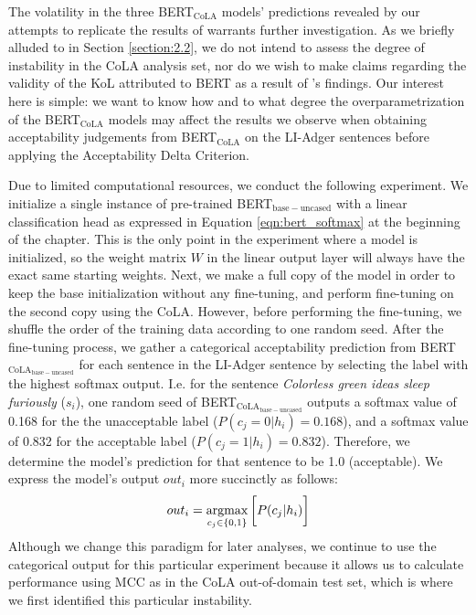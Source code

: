 The volatility in the three BERT$_\mathrm{CoLA}$ models' predictions revealed by our attempts to replicate the results of \citet{warstadt2019linguistic} warrants further investigation.  As we briefly alluded to in Section \ref{section:2.2}, we do not intend to assess the degree of instability in the CoLA analysis set, nor do we wish to make claims regarding the validity of the KoL attributed to BERT as a result of \citeauthor{warstadt2019linguistic}'s findings.  Our interest here is simple: we want to know how and to what degree the overparametrization of the BERT$_\mathrm{CoLA}$ models may affect the results we observe when obtaining acceptability judgements from BERT$_\mathrm{CoLA}$ on the LI-Adger sentences before applying the Acceptability Delta Criterion.

Due to limited computational resources, we conduct the following experiment.  We initialize a single instance of pre-trained BERT$_{\mathrm{base-uncased}}$ with a linear classification head as expressed in Equation \ref{eqn:bert_softmax} at the beginning of the chapter.  This is the only point in the experiment where a model is initialized, so the weight matrix $W$ in the linear output layer will always have the exact same starting weights.  Next, we make a full copy of the model in order to keep the base initialization without any fine-tuning, and perform fine-tuning on the second copy using the CoLA.  However, before performing the fine-tuning, we shuffle the order of the training data according to one random seed.  After the fine-tuning process, we gather a categorical acceptability prediction from BERT$_\mathrm{CoLA_{base-uncased}}$ for each sentence in the LI-Adger sentence by selecting the label with the highest softmax output.  I.e. for the sentence \textit{Colorless green ideas sleep furiously} ($s_i$), one random seed of BERT$_\mathrm{CoLA_{base-uncased}}$ outputs a softmax value of 0.168 for the the unacceptable label ($P(c_j=0|h_i) = 0.168$), and a softmax value of 0.832 for the acceptable label ($P(c_j=1|h_i) = 0.832$). Therefore, we determine the model's prediction for that sentence to be 1.0 (acceptable).  We express the model's output $out_i$ more succinctly as follows:
\begin{equation}
    out_i = \operatorname*{argmax}_{c_j \in \{0, 1\}}\bigg[P(c_j|h_i)\bigg]
\end{equation}
Although we change this paradigm for later analyses, we continue to use the categorical output for this particular experiment because it allows us to calculate performance using MCC as in the CoLA out-of-domain test set, which is where we first identified this particular instability.

